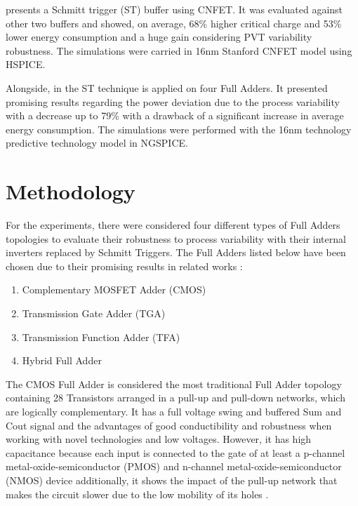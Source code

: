 \documentclass[ecp,tc, english]{iiufrgs}
\begin{document}
\cite{moghaddam2017design} presents a Schmitt trigger (ST) buffer using CNFET. It was evaluated against other two buffers and showed, on average, 68\% higher critical charge and 53\% lower energy consumption and a huge gain considering PVT variability robustness. The simulations were carried in 16nm Stanford CNFET model using HSPICE.
	
Alongside, in \cite{samuel2016} the ST technique is applied on four Full Adders. It presented promising results regarding the power deviation due to the process variability with a decrease up to 79\% with a drawback of a significant increase in average energy consumption. The simulations were performed with the 16nm technology predictive technology model in NGSPICE. 

\chapter{Methodology}

For the experiments, there were considered four different types of Full Adders topologies to evaluate their robustness to process variability with their internal inverters replaced by Schmitt Triggers. The Full Adders listed below have been chosen due to their promising results in related works \cite{ames2016investigating} \cite{dokania2015circuit} \cite{dokania2013investigation}:

\begin{enumerate}
    \item Complementary MOSFET Adder (CMOS)
    \item Transmission Gate Adder (TGA)
    \item Transmission Function Adder (TFA)
    \item Hybrid Full Adder
\end{enumerate}

The CMOS Full Adder is considered the most traditional Full Adder topology containing 28 Transistors arranged in a pull-up and pull-down networks, which are logically complementary. It has a full voltage swing and buffered Sum and Cout signal and the advantages of good conductibility and robustness when working with novel technologies and low voltages. However, it has high capacitance because each input is connected to the gate of at least a p-channel metal-oxide-semiconductor (PMOS) and n-channel metal-oxide-semiconductor (NMOS) device additionally, it shows the impact of the pull-up network that makes the circuit slower due to the low mobility of its holes \cite{beckett2002fine} \cite{devadas2017design} \cite{islam2011design}. 
\end{document}
